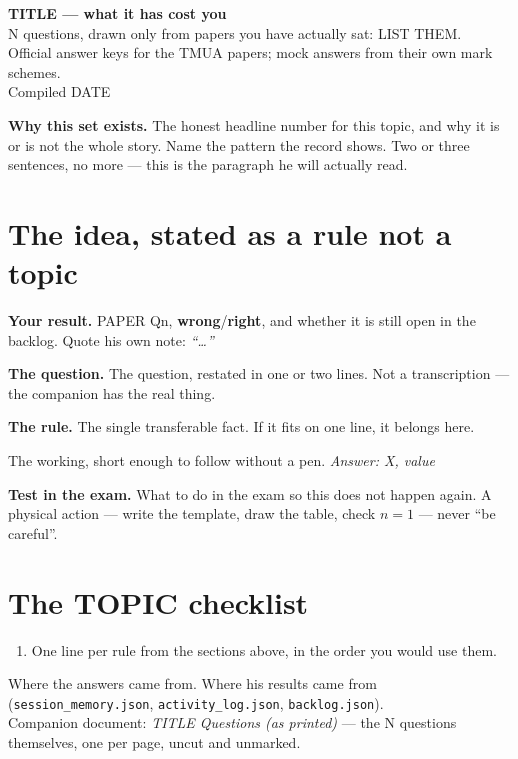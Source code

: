 \documentclass[11pt,a4paper]{article}
\newcommand{\bit}[1]{\textbf{\color{accent}Your result.} #1\par}
\newcommand{\rulez}[1]{\textbf{The rule.} #1\par}
\newcommand{\test}[1]{\par\smallskip\textbf{Test in the exam.} #1\par}
\newcommand{\eg}[1]{\textbf{The question.} #1\par}
\newcommand{\ans}[1]{\textit{Answer: #1}}
\begin{document}
\begin{center}
{\LARGE\bfseries TITLE --- what it has cost you}\\[5pt]
{\small N questions, drawn only from papers you have actually sat: LIST THEM.\\
Official answer keys for the TMUA papers; mock answers from their own mark schemes.\\
Compiled DATE}
\end{center}

\begin{keybox}
\textbf{Why this set exists.} The honest headline number for this topic, and why it is or is
not the whole story. Name the pattern the record shows. Two or three sentences, no more ---
this is the paragraph he will actually read.
\end{keybox}

\section{The idea, stated as a rule not a topic}
\bit{PAPER Qn, \textbf{wrong}/\textbf{right}, and whether it is still open in the backlog.
Quote his own note: \emph{``\ldots''}}
\eg{The question, restated in one or two lines. Not a transcription --- the companion has
the real thing.}
\rulez{The single transferable fact. If it fits on one line, it belongs here.}
The working, short enough to follow without a pen. \ans{X, value}
\test{What to do in the exam so this does not happen again. A physical action --- write the
template, draw the table, check $n=1$ --- never ``be careful''.}

\newpage
\section*{\color{accent}The TOPIC checklist}
\begin{keybox}
\begin{enumerate}[leftmargin=1.4em,itemsep=3pt,topsep=2pt]
  \item One line per rule from the sections above, in the order you would use them.
\end{enumerate}
\end{keybox}
\vfill
{\small Where the answers came from. Where his results came from
(\texttt{session\_memory.json}, \texttt{activity\_log.json}, \texttt{backlog.json}).\\
Companion document: \textit{TITLE Questions (as printed)} --- the N questions themselves,
one per page, uncut and unmarked.}
\end{document}
